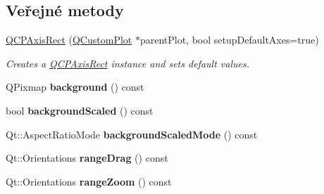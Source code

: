 \subsection*{Veřejné metody}
\begin{DoxyCompactItemize}
\item 
\hyperlink{classQCPAxisRect_a60b31dece805462c1b82eea2e69ba042}{Q\+C\+P\+Axis\+Rect} (\hyperlink{classQCustomPlot}{Q\+Custom\+Plot} $\ast$parent\+Plot, bool setup\+Default\+Axes=true)
\begin{DoxyCompactList}\small\item\em Creates a \hyperlink{classQCPAxisRect}{Q\+C\+P\+Axis\+Rect} instance and sets default values. \end{DoxyCompactList}\item 
\hypertarget{classQCPAxisRect_a0daa1dadd2a62dbfa37b7f742edd0059}{}Q\+Pixmap {\bfseries background} () const \label{classQCPAxisRect_a0daa1dadd2a62dbfa37b7f742edd0059}

\item 
\hypertarget{classQCPAxisRect_a67c18777b88fe9c81dee3dd2b5f50e5c}{}bool {\bfseries background\+Scaled} () const \label{classQCPAxisRect_a67c18777b88fe9c81dee3dd2b5f50e5c}

\item 
\hypertarget{classQCPAxisRect_a3d0f42d6be11a0b3d4576402a2b0032d}{}Qt\+::\+Aspect\+Ratio\+Mode {\bfseries background\+Scaled\+Mode} () const \label{classQCPAxisRect_a3d0f42d6be11a0b3d4576402a2b0032d}

\item 
\hypertarget{classQCPAxisRect_af24b46954ce27a26b23770cdb8319080}{}Qt\+::\+Orientations {\bfseries range\+Drag} () const \label{classQCPAxisRect_af24b46954ce27a26b23770cdb8319080}

\item 
\hypertarget{classQCPAxisRect_a3397fc60e5df29089090bc236e9f05f6}{}Qt\+::\+Orientations {\bfseries range\+Zoom} () const \label{classQCPAxisRect_a3397fc60e5df29089090bc236e9f05f6}


\end{DoxyCompactItemize}
